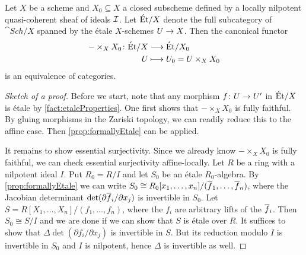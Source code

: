 \begin{prop}\label{prop:thickeningEtaleEquivalence}
	Let $X$ be a scheme and $X_0\subseteq X$ a closed subscheme defined by a locally nilpotent quasi-coherent sheaf of ideals $\mathcal{I}$. Let $\mathrm{\acute{E}t}/X$ denote the full subcategory of $\cat{Sch}/X$ spanned by the étale $X$-schemes $U\morphism X$. Then the canonical functor
	\begin{align*}
		-\times_XX_0\colon \Et/X&\morphism\Et/X_0\\
		U&\longmapsto U_0=U\times_XX_0
	\end{align*}
	is an equivalence of categories.
\end{prop}
\begin{proof}[Sketch of a proof]
	Before we start, note that any morphism $f\colon U\morphism U'$ in $\mathrm{\acute{E}t}/X$ is étale by \cref{fact:etaleProperties}.	One first shows that $-\times_XX_0$ is fully faithful. By gluing morphisms in the Zariski topology, we can readily reduce this to the affine case. Then \cref{prop:formallyEtale} can be applied.
	
	It remains to show essential surjectivity. Since we already know $-\times_XX_0$ is fully faithful, we can check essential surjectivity affine-locally. Let $R$ be a ring with a nilpotent ideal $I$. Put $R_0=R/I$ and let $S_0$ be an étale $R_0$-algebra. By \cref{prop:formallyEtale} we can write $S_0\cong R_0[x_1,\dotsc,x_n]/(\ov{f}_1,\dotsc,\ov{f}_n)$, where the Jacobian determinant $\det(\partial \ov{f}_i/\partial x_j)$ is invertible in $S_0$. Let $S=R[X_1,\dotsc,X_n]/(f_1,\dotsc,f_n)$, where the $f_i$ are arbitrary lifts of the $\ov{f}_i$. Then $S_0\cong S/I$ and we are done if we can show that $S$ is étale over $R$. It suffices to show that $\Delta \det(\partial f_i/\partial x_j)$ is invertible in $S$. But its reduction modulo $I$ is invertible in $S_0$ and $I$ is nilpotent, hence $\Delta$ is invertible as well.
\end{proof}
